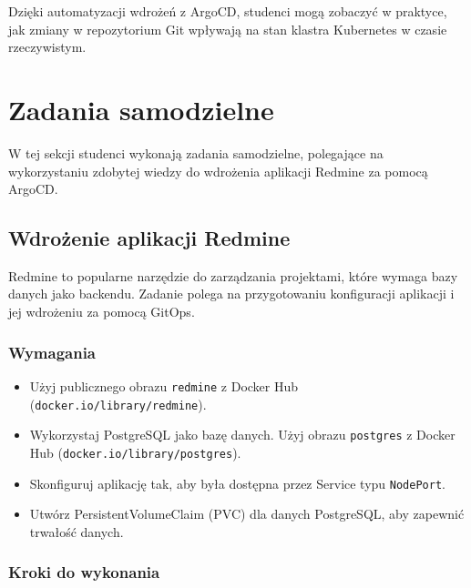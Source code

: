 \documentclass{article}
\begin{document}
Dzięki automatyzacji wdrożeń z ArgoCD, studenci mogą zobaczyć w praktyce, jak zmiany w repozytorium Git wpływają na stan klastra Kubernetes w czasie rzeczywistym.
\section{Zadania samodzielne}

W tej sekcji studenci wykonają zadania samodzielne, polegające na wykorzystaniu zdobytej wiedzy do wdrożenia aplikacji Redmine za pomocą ArgoCD.

\subsection{Wdrożenie aplikacji Redmine}

Redmine to popularne narzędzie do zarządzania projektami, które wymaga bazy danych jako backendu. Zadanie polega na przygotowaniu konfiguracji aplikacji i jej wdrożeniu za pomocą GitOps.

\subsubsection{Wymagania}
\begin{itemize}
    \item Użyj publicznego obrazu \texttt{redmine} z Docker Hub (\texttt{docker.io/library/redmine}).
    \item Wykorzystaj PostgreSQL jako bazę danych. Użyj obrazu \texttt{postgres} z Docker Hub (\texttt{docker.io/library/postgres}).
    \item Skonfiguruj aplikację tak, aby była dostępna przez Service typu \texttt{NodePort}.
    \item Utwórz PersistentVolumeClaim (PVC) dla danych PostgreSQL, aby zapewnić trwałość danych.
\end{itemize}

\subsubsection{Kroki do wykonania}
\end{document}
